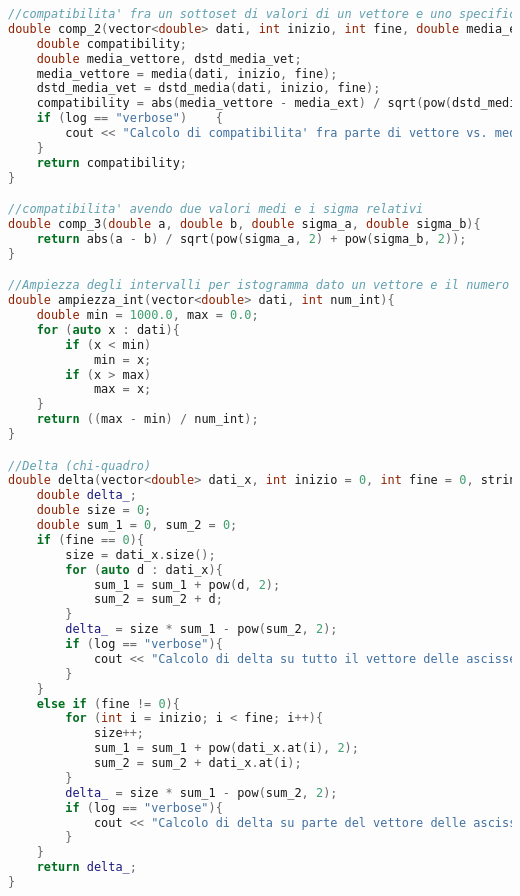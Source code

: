 \documentclass[a4paper,11pt,oneside]{article}
\begin{document}
\begin{lstlisting}[language=C++, label=lst:statistica.h, caption=statistica.h]
//compatibilita' fra un sottoset di valori di un vettore e uno specifico valore fornito separatamente
double comp_2(vector<double> dati, int inizio, int fine, double media_ext, double dstd_media_ext, string log = ""){
    double compatibility;
    double media_vettore, dstd_media_vet;
    media_vettore = media(dati, inizio, fine);
    dstd_media_vet = dstd_media(dati, inizio, fine);
    compatibility = abs(media_vettore - media_ext) / sqrt(pow(dstd_media_vet, 2) + pow(dstd_media_ext, 2));
    if (log == "verbose")    {
        cout << "Calcolo di compatibilita' fra parte di vettore vs. media e dstd media esterne (" << compatibility << ")" << endl;
    }
    return compatibility;
}

//compatibilita' avendo due valori medi e i sigma relativi
double comp_3(double a, double b, double sigma_a, double sigma_b){
    return abs(a - b) / sqrt(pow(sigma_a, 2) + pow(sigma_b, 2));
}

//Ampiezza degli intervalli per istogramma dato un vettore e il numero di intervalli
double ampiezza_int(vector<double> dati, int num_int){
    double min = 1000.0, max = 0.0;
    for (auto x : dati){
        if (x < min)
            min = x;
        if (x > max)
            max = x;
    }
    return ((max - min) / num_int);
}

//Delta (chi-quadro)
double delta(vector<double> dati_x, int inizio = 0, int fine = 0, string log = ""){
    double delta_;
    double size = 0;
    double sum_1 = 0, sum_2 = 0;
    if (fine == 0){
        size = dati_x.size();
        for (auto d : dati_x){
            sum_1 = sum_1 + pow(d, 2);
            sum_2 = sum_2 + d;
        }
        delta_ = size * sum_1 - pow(sum_2, 2);
        if (log == "verbose"){
            cout << "Calcolo di delta su tutto il vettore delle ascisse per chi quadro (" << delta_ << ")" << endl;
        }
    }
    else if (fine != 0){
        for (int i = inizio; i < fine; i++){
            size++;
            sum_1 = sum_1 + pow(dati_x.at(i), 2);
            sum_2 = sum_2 + dati_x.at(i);
        }
        delta_ = size * sum_1 - pow(sum_2, 2);
        if (log == "verbose"){
            cout << "Calcolo di delta su parte del vettore delle ascisse per chi quadro (" << delta_ << ")" << endl;
        }
    }
    return delta_;
}


\end{lstlisting}
\end{document}
